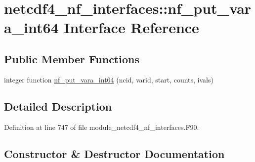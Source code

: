 \hypertarget{interfacenetcdf4__nf__interfaces_1_1nf__put__vara__int64}{}\section{netcdf4\+\_\+nf\+\_\+interfaces\+:\+:nf\+\_\+put\+\_\+vara\+\_\+int64 Interface Reference}
\label{interfacenetcdf4__nf__interfaces_1_1nf__put__vara__int64}
\subsection*{Public Member Functions}
\begin{DoxyCompactItemize}
\item 
integer function \hyperlink{interfacenetcdf4__nf__interfaces_1_1nf__put__vara__int64_ab33cb702e412c42bab87e3f55faf0589}{nf\+\_\+put\+\_\+vara\+\_\+int64} (ncid, varid, start, counts, ivals)
\end{DoxyCompactItemize}


\subsection{Detailed Description}


Definition at line 747 of file module\+\_\+netcdf4\+\_\+nf\+\_\+interfaces.\+F90.



\subsection{Constructor \& Destructor Documentation}
\mbox{\label{interfacenetcdf4__nf__interfaces_1_1nf__put__vara__int64_ab33cb702e412c42bab87e3f55faf0589}} 
